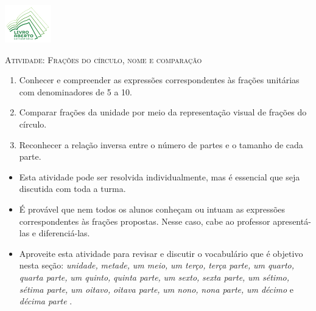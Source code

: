 \documentclass[10 pt,usenames,dvipsnames, oneside]{article}
\begin{document}
\begin{center}
  \begin{minipage}[l]{3cm}
\includegraphics[width=2cm]{../../../Figuras/logo}       
\end{minipage}\hfill
\begin{minipage}[r]{.8\textwidth}
 {\Large \scshape Atividade: Frações do círculo, nome e comparação}  
\end{minipage}
\end{center}
\vspace{.2cm}

\ifdefined\prof
\begin{goals}
\begin{enumerate}

    \item Conhecer e compreender as expressões correspondentes às frações unitárias com denominadores de 5 a 10.
    \item Comparar frações da unidade por meio da representação visual de frações do círculo.
    \item Reconhecer a relação inversa entre o número de partes e o tamanho de cada parte.

\end{enumerate}
\tcblower

\begin{itemize} %
    \item       Esta atividade pode ser resolvida individualmente, mas é essencial que seja discutida com toda a turma.
    \item       É provável que nem todos os alunos conheçam ou intuam as expressões correspondentes às frações propostas. Nesse caso, cabe ao professor apresentá-las e diferenciá-las.
    \item       Aproveite esta atividade para revisar e discutir o vocabulário que é objetivo nesta seção:       {\it unidade,}             {\it metade,}             {\it um meio,}             {\it um terço,}             {\it terça parte,}             {\it um quarto,}             {\it quarta parte,}             {\it um quinto,}             {\it quinta parte,}             {\it um sexto,}             {\it sexta parte,}             {\it um sétimo,}             {\it sétima parte,}             {\it um oitavo,}             {\it oitava parte,}             {\it um nono,}             {\it nona parte,}             {\it um décimo}       e       {\it décima parte}      .
\end{itemize} %


\end{goals}
\end{document}
